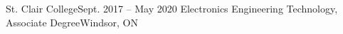 \resumeSubheading
{St. Clair College}{Sept. 2017 -- May 2020}
{Electronics Engineering Technology, Associate Degree}{Windsor, ON}
